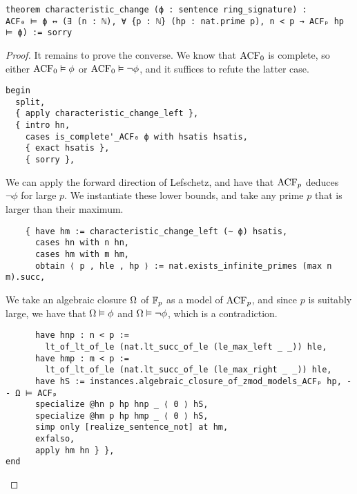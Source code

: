 \begin{lstlisting}
theorem characteristic_change (ϕ : sentence ring_signature) :
ACF₀ ⊨ ϕ ↔ (∃ (n : ℕ), ∀ {p : ℕ} (hp : nat.prime p), n < p → ACFₚ hp ⊨ ϕ) := sorry \end{lstlisting}
\begin{proof}
It remains to prove the converse.
We know that $\operatorname{ACF}_{0}$ is complete,
so either $\operatorname{ACF}_{0} \vDash \phi$ or $\operatorname{ACF}_{0} \vDash \neg \phi$,
and it suffices to refute the latter case.

\begin{lstlisting}
begin
  split,
  { apply characteristic_change_left },
  { intro hn,
    cases is_complete'_ACF₀ ϕ with hsatis hsatis,
    { exact hsatis },
    { sorry }, \end{lstlisting}

We can apply the forward direction of Lefschetz,
and have that $\operatorname{ACF}_{p}$ deduces $\neg \phi$ for large $p$.
We instantiate these lower bounds, and take any prime $p$ that is larger
than their maximum.

\begin{lstlisting}
    { have hm := characteristic_change_left (∼ ϕ) hsatis,
      cases hn with n hn,
      cases hm with m hm,
      obtain ⟨ p , hle , hp ⟩ := nat.exists_infinite_primes (max n m).succ, \end{lstlisting}

We take an algebraic closure $\Omega$ of $\mathbb{F}_{p}$ as a model of $\operatorname{ACF}_{p}$,
and since $p$ is suitably large, we have that $\Omega \vDash \phi$ and
$\Omega \vDash \neg \phi$, which is a contradiction.

\begin{lstlisting}
      have hnp : n < p :=
        lt_of_lt_of_le (nat.lt_succ_of_le (le_max_left _ _)) hle,
      have hmp : m < p :=
        lt_of_lt_of_le (nat.lt_succ_of_le (le_max_right _ _)) hle,
      have hS := instances.algebraic_closure_of_zmod_models_ACFₚ hp, -- Ω ⊨ ACFₚ
      specialize @hn p hp hnp _ ⟨ 0 ⟩ hS,
      specialize @hm p hp hmp _ ⟨ 0 ⟩ hS,
      simp only [realize_sentence_not] at hm,
      exfalso,
      apply hm hn } },
end \end{lstlisting}

\end{proof}
